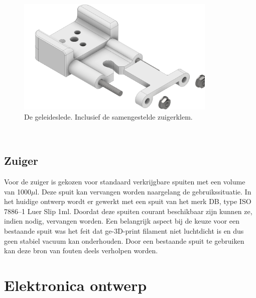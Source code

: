 \begin{minipage}[t]{0.59\textwidth}
    \vspace{0pt}
    \begin{figure}[H]
        \centering
        \includegraphics[width=0.85\textwidth]{figures/CarriageAndClamp.png}
        \caption{De geleideslede. Inclusief de samengestelde zuigerklem.}\label{fig:CarriageAndClamp}
    \end{figure}
\end{minipage}\\

\subsection{Zuiger}
Voor de zuiger is gekozen voor standaard verkrijgbare spuiten met een volume van 1000$\mu$l. Deze spuit kan vervangen worden naargelang de gebruikssituatie. In het huidige ontwerp wordt er gewerkt met een spuit van het merk DB, type ISO 7886--1 Luer Slip 1ml. Doordat deze spuiten courant beschikbaar zijn kunnen ze, indien nodig, vervangen worden.
Een belangrijk aspect bij de keuze voor een bestaande spuit was het feit dat ge-3D-print filament niet luchtdicht is en dus geen stabiel vacuum kan onderhouden. Door een bestaande spuit te gebruiken kan deze bron van fouten deels verholpen worden.

\section{Elektronica ontwerp}
